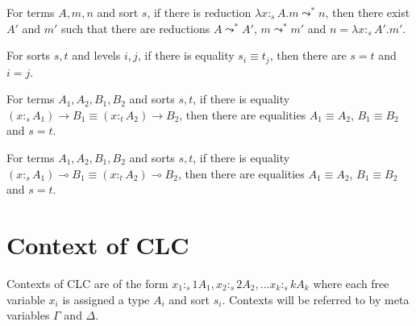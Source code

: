 \documentclass[sigplan,screen,review,anonymous]{acmart}
\newcommand{\stype}[1]{:_#1}
\newcommand{\red}{\leadsto^*}
\begin{document}
\begin{corollary}\label{redlaminv}
  For terms $A, m, n$ and sort $s$, if there is reduction $\lambda x \stype{s} A.m \red n$, then there exist $A'$ and $m'$ such that there are reductions $A \red A'$, $m \red m'$ and $n = \lambda x \stype{s} A'.m'$.
\end{corollary}

\begin{corollary}\label{sortinj}
  For sorts $s, t$ and levels $i, j$, if there is equality $s_i \equiv t_j$, then there are $s = t$ and $i = j$.
\end{corollary}

\begin{corollary}\label{arrowinj}
  For terms $A_1, A_2, B_1, B_2$ and sorts $s, t$, if there is equality $(x \stype{s} A_1) \rightarrow B_1 \equiv (x \stype{t} A_2) \rightarrow B_2$, then there are equalities $A_1 \equiv A_2$, $B_1 \equiv B_2$ and $s = t$.
\end{corollary}

\begin{corollary}\label{lolliinj}
  For terms $A_1, A_2, B_1, B_2$ and sorts $s, t$, if there is equality $(x \stype{s} A_1) \multimap B_1 \equiv (x \stype{t} A_2) \multimap B_2$, then there are equalities $A_1 \equiv A_2$, $B_1 \equiv B_2$ and $s = t$.
\end{corollary}

\section{Context of CLC}
Contexts of CLC are of the form $x_1 \stype{s1} A_1, x_2 \stype{s2} A_2, ... x_k \stype{sk} A_k$ where each free variable $x_i$ is assigned a type $A_i$ and sort $s_i$. Contexts will be referred to by meta variables $\Gamma$ and $\Delta$.
\end{document}
